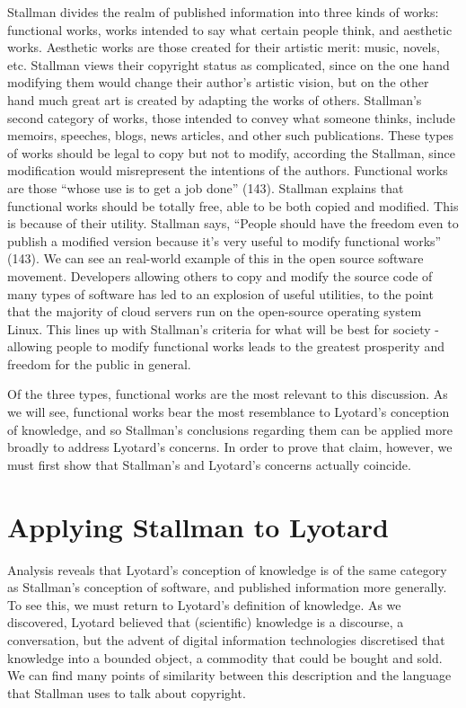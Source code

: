 \documentclass[titlepage]{article}
\begin{document}
Stallman divides the realm of published information into three kinds of
works: functional works, works intended to say what certain people
think, and aesthetic works. Aesthetic works are those created for their
artistic merit: music, novels, etc. Stallman views their copyright
status as complicated, since on the one hand modifying them would change
their author's artistic vision, but on the other hand much great art is
created by adapting the works of others. Stallman's second category of
works, those intended to convey what someone thinks, include memoirs,
speeches, blogs, news articles, and other such publications. These types
of works should be legal to copy but not to modify, according the
Stallman, since modification would misrepresent the intentions of the
authors. Functional works are those ``whose use is to get a job done''
(143). Stallman explains that functional works should be totally free,
able to be both copied and modified. This is because of their utility.
Stallman says, ``People should have the freedom even to publish a
modified version because it's very useful to modify functional works''
(143). We can see an real-world example of this in the open source
software movement. Developers allowing others to copy and modify the
source code of many types of software has led to an explosion of useful
utilities, to the point that the majority of cloud servers run on the
open-source operating system Linux. This lines up with Stallman's
criteria for what will be best for society - allowing people to modify
functional works leads to the greatest prosperity and freedom for the
public in general.

Of the three types, functional works are the most relevant to this
discussion. As we will see, functional works bear the most resemblance
to Lyotard's conception of knowledge, and so Stallman's conclusions
regarding them can be applied more broadly to address Lyotard's
concerns. In order to prove that claim, however, we must first show that
Stallman's and Lyotard's concerns actually coincide.

\section{Applying Stallman to
Lyotard}\label{applying-stallman-to-lyotard}

Analysis reveals that Lyotard's conception of knowledge is of the same
category as Stallman's conception of software, and published information
more generally. To see this, we must return to Lyotard's definition of
knowledge. As we discovered, Lyotard believed that (scientific)
knowledge is a discourse, a conversation, but the advent of digital
information technologies discretised that knowledge into a bounded
object, a commodity that could be bought and sold. We can find many
points of similarity between this description and the language that
Stallman uses to talk about copyright.
\end{document}
